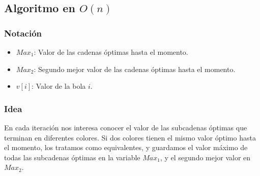 \documentclass{article}
\begin{document}
\subsection*{Algoritmo en $O(n)$}
\subsubsection*{Notación}
\begin{itemize}
    \item $Max_1$: Valor de las cadenas óptimas hasta el momento.
    \item $Max_2$: Segundo mejor valor de las cadenas óptimas hasta el momento.
    \item $v[i]$: Valor de la bola $i$.
\end{itemize}

\subsubsection*{Idea}
En cada iteración nos interesa conocer el valor de las subcadenas óptimas que terminan en diferentes colores. Si dos colores tienen el mismo valor óptimo hasta el momento, los tratamos como equivalentes, y guardamos el valor máximo de todas las subcadenas óptimas en la variable $Max_1$, y el segundo mejor valor en $Max_2$.
\end{document}
